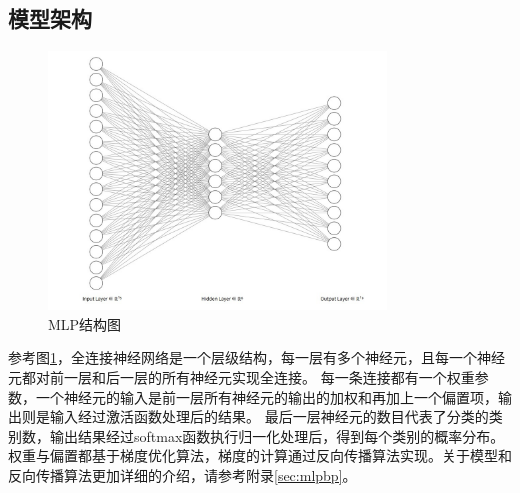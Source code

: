 \documentclass[12pt,a4paper]{article}
\begin{document}
\subsection{模型架构}
\begin{figure}[H]
    \centering
    \includegraphics[width=0.8\textwidth]{../images/1.jpg}
    \caption{MLP结构图}
    \label{fig:mlpstructure}
\end{figure}
参考图\ref{fig:mlpstructure}，全连接神经网络是一个层级结构，每一层有多个神经元，且每一个神经元都对前一层和后一层的所有神经元实现全连接。
每一条连接都有一个权重参数，一个神经元的输入是前一层所有神经元的输出的加权和再加上一个偏置项，输出则是输入经过激活函数处理后的结果。
最后一层神经元的数目代表了分类的类别数，输出结果经过softmax函数执行归一化处理后，得到每个类别的概率分布。权重与偏置都基于梯度优化算法，梯度的计算通过反向传播算法实现。关于模型和反向传播算法更加详细的介绍，请参考附录\ref{sec:mlpbp}。
\end{document}
